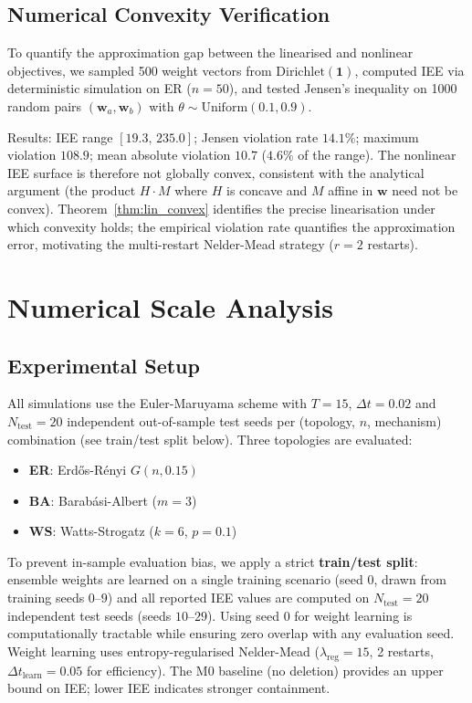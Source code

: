 \documentclass[review,12pt]{elsarticle}
\newcommand{\bfw}{\mathbf{w}}
\begin{document}
\subsection{Numerical Convexity Verification}
\label{sec:convexity}

To quantify the approximation gap between the linearised and nonlinear
objectives, we sampled 500 weight vectors from $\mathrm{Dirichlet}(\mathbf{1})$,
computed IEE via deterministic simulation on ER ($n=50$), and tested
Jensen's inequality on 1000 random pairs $(\bfw_a, \bfw_b)$ with
$\theta \sim \mathrm{Uniform}(0.1,0.9)$.

Results: IEE range $[19.3,\,235.0]$; Jensen violation rate $14.1\%$;
maximum violation $108.9$; mean absolute violation $10.7$ ($4.6\%$ of
the range).  The nonlinear IEE surface is therefore not globally convex,
consistent with the analytical argument (the product $H \cdot M$ where
$H$ is concave and $M$ affine in $\bfw$ need not be convex).
Theorem~\ref{thm:lin_convex} identifies the precise linearisation under
which convexity holds; the empirical violation rate quantifies the
approximation error, motivating the multi-restart Nelder-Mead strategy
($r=2$ restarts).

\section{Numerical Scale Analysis}
\label{sec:results}

\subsection{Experimental Setup}

All simulations use the Euler-Maruyama scheme with $T = 15$, $\Delta t = 0.02$
and $N_{\mathrm{test}} = 20$ independent out-of-sample test seeds per
(topology, $n$, mechanism) combination (see train/test split below).
Three topologies are evaluated:
\begin{itemize}
  \item \textbf{ER}: Erd\H{o}s-R\'enyi $G(n, 0.15)$~\cite{erdos1960evolution}
  \item \textbf{BA}: Barab\'asi-Albert ($m=3$)~\cite{barabasi1999emergence}
  \item \textbf{WS}: Watts-Strogatz ($k=6$, $p=0.1$)~\cite{watts1998collective}
\end{itemize}
To prevent in-sample evaluation bias, we apply a strict \textbf{train/test
split}: ensemble weights are learned on a single training scenario (seed 0,
drawn from training seeds $0$--$9$) and all reported IEE values are
computed on $N_{\mathrm{test}}=20$ independent test seeds (seeds $10$--$29$).
Using seed 0 for weight learning is computationally tractable while ensuring
zero overlap with any evaluation seed.
Weight learning uses entropy-regularised Nelder-Mead
($\lambda_{\mathrm{reg}}=15$, 2 restarts, $\Delta t_{\mathrm{learn}}=0.05$
for efficiency). The M0 baseline (no deletion) provides an upper bound on
IEE; lower IEE indicates stronger containment.
\end{document}
